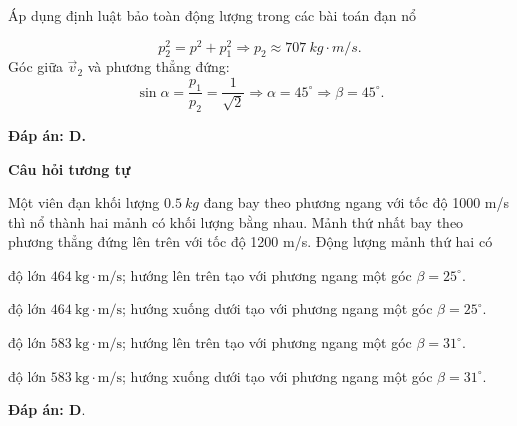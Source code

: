 \begin{dang}{Áp dụng định luật bảo toàn động lượng trong các bài toán đạn nổ}
{		
		\begin{equation*}
			p^2_2 =p^2+p^2_1 \Rightarrow p_2 \approx\SI{707}{kg \cdot m/s}.
		\end{equation*}
		Góc giữa $\vec v_2$ và phương thẳng đứng: 
		\begin{equation*}
			\sin \alpha = \dfrac{p_1}{p_2} = \dfrac{1}{\sqrt 2} \Rightarrow \alpha = 45^\circ \Rightarrow \beta = 45^\circ.
		\end{equation*}
		
		\textbf{Đáp án: D.}
		
		\begin{center}
			\textbf{Câu hỏi tương tự}
		\end{center}
		
		Một viên đạn khối lượng $\SI{0.5}{kg}$ đang bay theo phương ngang với tốc độ 1000 m/s thì nổ thành hai mảnh có khối lượng bằng nhau. Mảnh thứ nhất bay theo phương thẳng đứng lên trên với tốc độ 1200 m/s. Động lượng mảnh thứ hai có
		\begin{mcq}
			\item độ lớn $464\ \text{kg} \cdot \text{m/s}$; hướng lên trên tạo với phương ngang một góc $\beta= 25^\circ$.
			\item độ lớn $464\ \text{kg} \cdot \text{m/s}$; hướng xuống dưới tạo với phương ngang một góc $\beta= 25^\circ$. 
			\item độ lớn $583\ \text{kg} \cdot \text{m/s}$; hướng lên trên tạo với phương ngang một góc $\beta= 31^\circ$. 
			\item độ lớn $583\ \text{kg} \cdot \text{m/s}$; hướng xuống dưới tạo với phương ngang một góc $\beta= 31^\circ$.
		\end{mcq}
		
		\textbf{Đáp án: D}.
	}
	
\end{dang}
